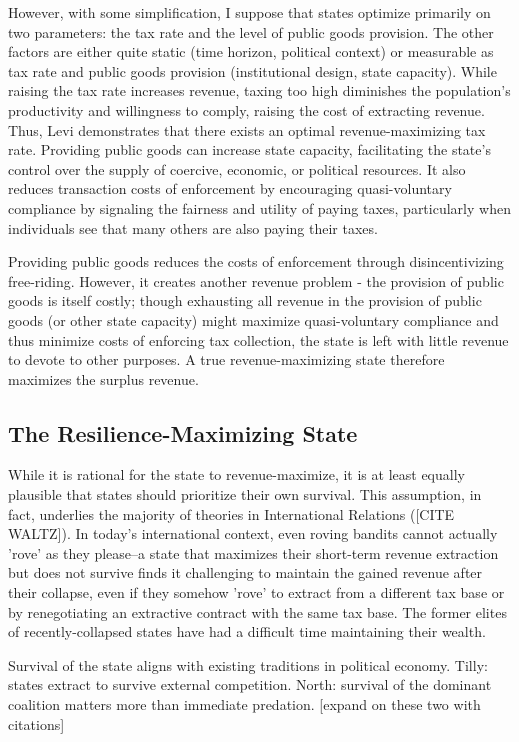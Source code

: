 \documentclass[bibtex,nonblind]{apsr_submission}
\begin{document}
However, with some simplification, I suppose that states optimize primarily on two parameters: the tax rate and the level of public goods provision. The other factors are either quite static (time horizon, political context) or measurable as tax rate and public goods provision (institutional design, state capacity). While raising the tax rate increases revenue, taxing too high diminishes the population's productivity and willingness to comply, raising the cost of extracting revenue. Thus, Levi \cite{levi1988} demonstrates that there exists an optimal revenue-maximizing tax rate. Providing public goods can increase state capacity, facilitating the state's control over the supply of coercive, economic, or political resources. It also reduces transaction costs of enforcement by encouraging quasi-voluntary compliance by signaling the fairness and utility of paying taxes, particularly when individuals see that many others are also paying their taxes.

Providing public goods reduces the costs of enforcement through disincentivizing free-riding. However, it creates another revenue problem - the provision of public goods is itself costly; though exhausting all revenue in the provision of public goods (or other state capacity) might maximize quasi-voluntary compliance and thus minimize costs of enforcing tax collection, the state is left with little revenue to devote to other purposes. A true revenue-maximizing state therefore maximizes the surplus revenue.

\subsection{The Resilience-Maximizing State}

While it is rational for the state to revenue-maximize, it is at least equally plausible that states should prioritize their own survival. This assumption, in fact, underlies the majority of theories in International Relations ([CITE WALTZ]). In today's international context, even roving bandits cannot actually 'rove' as they please--a state that maximizes their short-term revenue extraction but does not survive finds it challenging to maintain the gained revenue after their collapse, even if they somehow 'rove' to extract from a different tax base or by renegotiating an extractive contract with the same tax base. The former elites of recently-collapsed states have had a difficult time maintaining their wealth.

Survival of the state aligns with existing traditions in political economy. Tilly: states extract to survive external competition. North: survival of the dominant coalition matters more than immediate predation. [expand on these two with citations]
\end{document}
